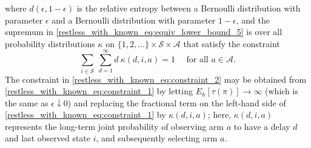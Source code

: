 where $d(\epsilon, 1-\epsilon)$ is the relative entropy between a Bernoulli distribution with parameter $\epsilon$ and a Bernoulli distribution with parameter $1-\epsilon$, and the supremum in \eqref{restless_with_known_eq:equiv_lower_bound_5} is over all probability distributions $\kappa$ on $\{1,2,\ldots\}\times\mathcal{S}\times\mathcal{A}$ that satisfy the constraint
\begin{equation}
	\sum\limits_{i\in\mathcal{S}}~\sum\limits_{d=1}^{\infty} d~\kappa(d,i,a)=1\quad \text{ for all }a\in\mathcal{A}.\label{restless_with_known_eq:constraint_2}
\end{equation}
The constraint in \eqref{restless_with_known_eq:constraint_2} may be obtained from \eqref{restless_with_known_eq:constraint_1} by letting $E_h[\tau(\pi)]\to \infty$ (which is the same as $\epsilon\downarrow 0$) and replacing the fractional term on the left-hand side of \eqref{restless_with_known_eq:constraint_1} by $\kappa(d,i,a)$; here, $\kappa(d,i,a)$ represents the long-term joint probability of observing arm $a$ to have a delay $d$ and last observed state $i$, and subsequently selecting arm $a$. 

